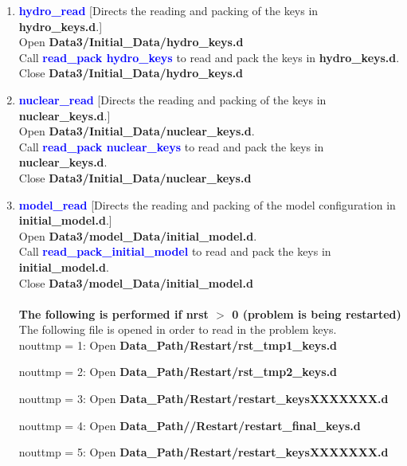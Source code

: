 \documentclass[11pt,doublespace]{article}
\begin{document}
\begin{itemize}
\begin{enumerate}
\begin{enumerate}
{\begin{enumerate}
\begin{enumerate}
  \item \textcolor{blue}{ {\bf hydro\_read} }
  [Directs the reading and packing of the keys in {\bf hydro\_keys.d}.]\\
  Open {\bf Data3/Initial\_Data/hydro\_keys.d}\\
  Call \textcolor{blue}{ {\bf read\_pack hydro\_keys} } to read and pack the keys  in {\bf hydro\_keys.d}.\\
  Close {\bf Data3/Initial\_Data/hydro\_keys.d}

  \item \textcolor{blue}{ {\bf nuclear\_read} }
  [Directs the reading and packing of the keys in {\bf nuclear\_keys.d}.]\\
  Open {\bf Data3/Initial\_Data/nuclear\_keys.d}.\\
  Call \textcolor{blue}{ {\bf read\_pack nuclear\_keys} } to read and pack the keys  in {\bf nuclear\_keys.d}.\\
  Close {\bf Data3/Initial\_Data/nuclear\_keys.d}

  \item \textcolor{blue}{ {\bf model\_read} }
  [Directs the reading and packing of the model configuration in {\bf initial\_model.d}.]\\
  Open {\bf Data3/model\_Data/initial\_model.d}.\\
  Call \textcolor{blue}{ {\bf read\_pack\_initial\_model} } to read and pack the keys  in {\bf initial\_model.d}.\\
  Close {\bf Data3/model\_Data/initial\_model.d}\\ \\

  {\bf The following is performed if nrst $>$ 0 (problem is being restarted)} \\
  
  The following file is opened in order to read in the problem keys.\\
  
  nouttmp = 1: Open {\bf Data\_Path/Restart/rst\_tmp1\_keys.d}
    
  nouttmp = 2: Open {\bf Data\_Path/Restart/rst\_tmp2\_keys.d}
    
  nouttmp = 3: Open {\bf Data\_Path/Restart/restart\_keysXXXXXXX.d}
    
  nouttmp = 4: Open {\bf Data\_Path//Restart/restart\_final\_keys.d}
    
  nouttmp = 5: Open {\bf Data\_Path/Restart/restart\_keysXXXXXXX.d}\\
  

\end{enumerate}
\end{enumerate}}
\end{enumerate}
\end{enumerate}
\end{itemize}
\end{document}
